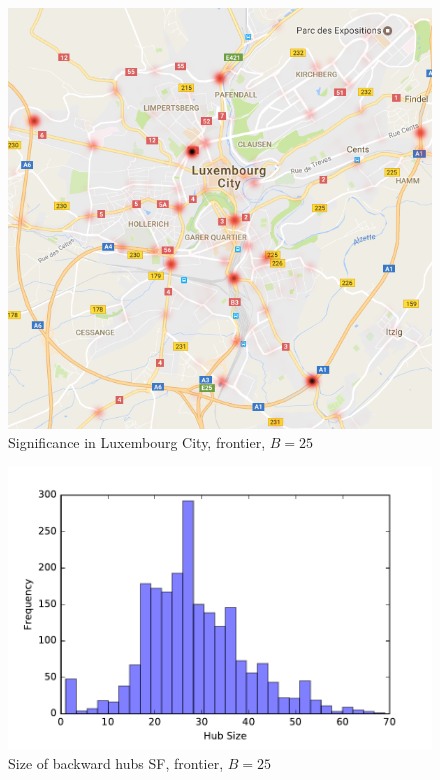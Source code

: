 \begin{figure}\caption{Significance in Luxembourg City, frontier, $B=25$}\label{fig:map_LU} 
\begin{center}
\includegraphics[scale=0.37]{TexImg/map_LU_sig.png}
\end{center}
\end{figure}

\begin{figure} \caption{Size of backward hubs SF, frontier, $B=25$}\label{fig:SF_bwd_size}
\begin{center}
\includegraphics[scale=0.5]{TexImg/SF_bwd_hub_size.pdf}
\end{center}
\end{figure}

